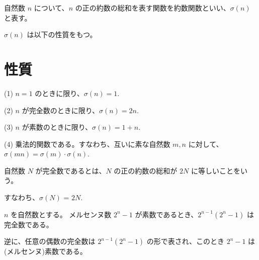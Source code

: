 %

\begin{definition}[約数関数]

自然数 \( n \) について、\( n \) の正の約数の総和を表す関数を約数関数といい、\( \sigma(n) \) と表す。

{\( \sigma(n)\) は以下の性質をもつ。}

\end{definition}

\section*{性質}

(1) \( n = 1 \) のときに限り、\( \sigma(n) = 1 \).

(2) \( n \) が完全数のときに限り、\( \sigma(n) = 2n \).

(3) \( n \) が素数のときに限り、\( \sigma(n) =  1 + n \).

(4) 乗法的関数である。すなわち、互いに素な自然数 \( m, n \) に対して、\( \sigma(mn) = \sigma(m) \cdot \sigma(n) \).

\begin{definition}[完全数]

自然数 \( N \) が完全数であるとは、\( N \) の正の約数の総和が \( 2N \) に等しいことをいう。

すなわち、\( \sigma(N)\) = \( 2N \).

\end{definition}

\begin{theorem}

\( n \) を自然数とする。
メルセンヌ数 \( 2^n - 1 \) が素数であるとき、\( 2^{n-1}(2^n - 1) \) は完全数である。

逆に、任意の偶数の完全数は \( 2^{n-1}(2^n - 1) \) の形で表され、このとき \( 2^n - 1 \) は(メルセンヌ)素数である。

\end{theorem}

